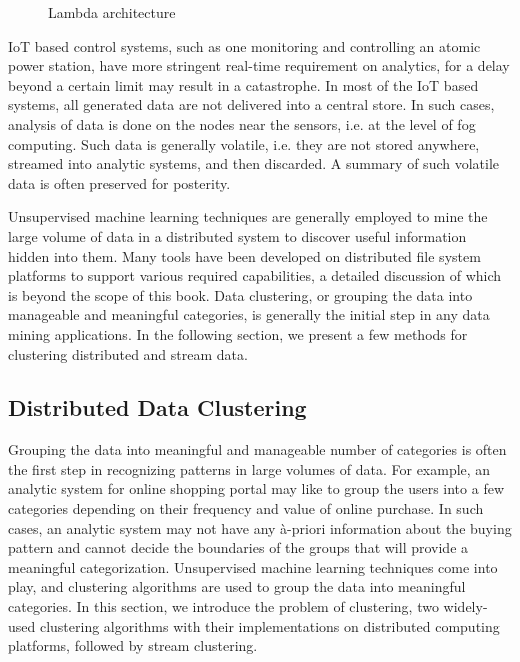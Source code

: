 \begin{figure}[htbp!]
	\centerline{
	}
	\caption{Lambda architecture}
	\label{fig:bigdata:lambda}
\end{figure}

IoT based control systems, such as one monitoring and controlling an atomic power station, have more stringent real-time requirement 
on analytics, for a delay beyond a certain limit may result in a catastrophe. In most of the IoT based systems, all generated data are 
not delivered into a central store. In such cases, analysis of data is done on the nodes near the sensors, i.e. at the level of fog 
computing. Such data is generally volatile, i.e. they are not stored anywhere, streamed into analytic systems, and then discarded. 
A summary of such volatile data is often preserved for posterity.

Unsupervised machine learning techniques are generally employed to mine the large volume of data in a distributed system to discover
useful information hidden into them. Many tools have been developed on distributed file system platforms to support various required
capabilities,
a detailed discussion of which is beyond the scope of this book. Data clustering, or grouping the data into manageable and meaningful
categories, is generally the initial step in any data mining applications. In the following section, we present a few methods for 
clustering distributed and stream data. 


\subsection{Distributed Data Clustering}

Grouping the data into meaningful and manageable number of categories is often the first step in recognizing patterns in large 
volumes of data. 
For example, an analytic system for online shopping portal may like to group the users into a few categories depending on their
frequency and value of online purchase. In such cases, an analytic system may not have any \`{a}-priori information about the
buying pattern and cannot decide the boundaries of the groups that will provide a meaningful categorization. Unsupervised machine
learning techniques come into play, and clustering algorithms are used to group the data into meaningful categories. In this 
section, we introduce the problem of clustering, two widely-used clustering algorithms with their implementations on 
distributed computing platforms, followed by stream clustering.

